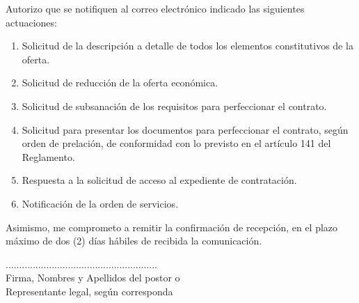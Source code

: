 \vspace{0.3cm}
    
Autorizo que se notifiquen al correo electrónico indicado las siguientes actuaciones:
    
\begin{enumerate}
    \item Solicitud de la descripción a detalle de todos los elementos constitutivos de la oferta.
    \item Solicitud de reducción de la oferta económica.
    \item Solicitud de subsanación de los requisitos para perfeccionar el contrato.
    \item Solicitud para presentar los documentos para perfeccionar el contrato, según orden de prelación, de conformidad con lo previsto en el artículo 141 del Reglamento.
    \item Respuesta a la solicitud de acceso al expediente de contratación.
    \item Notificación de la orden de servicios.
\end{enumerate}
    
\vspace{0.5cm}
    
Asimismo, me comprometo a remitir la confirmación de recepción, en el plazo máximo de dos (2) días hábiles de recibida la comunicación.
    
\vspace{0.5cm}
    
\fecha 
    
\vspace{2cm}
    
\begin{center}
........................................................\\
Firma, Nombres y Apellidos del postor o \\ 
Representante legal, según corresponda
\end{center}